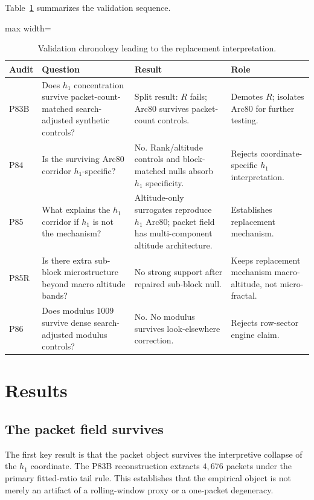 \documentclass[11pt]{article}
\newcommand{\primarypackets}{4{,}676}
\begin{document}
Table~\ref{tab:validation-chronology} summarizes the validation sequence.

\begin{table}[H]
\centering
\small
\begin{adjustbox}{max width=\textwidth}
\begin{tabular}{p{}p{}p{}p{}}
\toprule
\textbf{Audit} & \textbf{Question} & \textbf{Result} & \textbf{Role} \\
\midrule
P83B & Does \(h_1\) concentration survive packet-count-matched search-adjusted synthetic controls? & Split result: \(R\) fails; Arc80 survives packet-count controls. & Demotes \(R\); isolates Arc80 for further testing. \\
P84 & Is the surviving Arc80 corridor \(h_1\)-specific? & No. Rank/altitude controls and block-matched nulls absorb \(h_1\) specificity. & Rejects coordinate-specific \(h_1\) interpretation. \\
P85 & What explains the \(h_1\) corridor if \(h_1\) is not the mechanism? & Altitude-only surrogates reproduce \(h_1\) Arc80; packet field has multi-component altitude architecture. & Establishes replacement mechanism. \\
P85R & Is there extra sub-block microstructure beyond macro altitude bands? & No strong support after repaired sub-block null. & Keeps replacement mechanism macro-altitude, not micro-fractal. \\
P86 & Does modulus \(1009\) survive dense search-adjusted modulus controls? & No. No modulus survives look-elsewhere correction. & Rejects row-sector engine claim. \\
\bottomrule
\end{tabular}
\end{adjustbox}
\caption{Validation chronology leading to the replacement interpretation.}
\label{tab:validation-chronology}
\end{table}

\section{Results}

\subsection{The packet field survives}

The first key result is that the packet object survives the interpretive collapse of the \(h_1\) coordinate. The P83B reconstruction extracts \(\primarypackets\) packets under the primary fitted-ratio tail rule. This establishes that the empirical object is not merely an artifact of a rolling-window proxy or a one-packet degeneracy.
\end{document}
